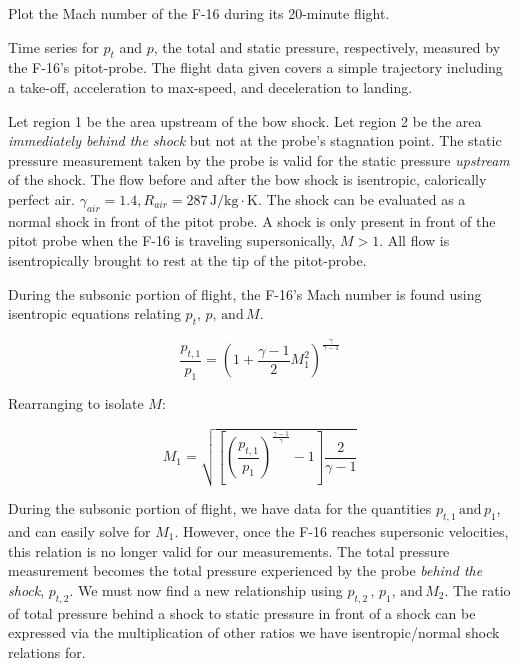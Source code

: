 \documentclass[../main.tex]{subfiles}
\begin{document}

 Plot the Mach number of the F-16 during its 20-minute flight.

\givens{}

Time series for \(p_t\) and \(p\), the total and static pressure, respectively, measured by the F-16's pitot-probe.
The flight data given covers a simple trajectory including a take-off, acceleration to max-speed, and deceleration to landing.

\assumptions{}

Let region 1 be the area upstream of the bow shock.
Let region 2 be the area \textit{immediately behind the shock} but not at the probe's stagnation point.
The static pressure measurement taken by the probe is valid for the static pressure \textit{upstream} of the shock.
The flow before and after the bow shock is isentropic, calorically perfect air. \(\gamma_{air} = 1.4, R_{air} = 287 \, \unit{\joule/\kilogram\cdot\kelvin}\).
The shock can be evaluated as a normal shock in front of the pitot probe.
A shock is only present in front of the pitot probe when the F-16 is traveling supersonically, \(M > 1\).
All flow is isentropically brought to rest at the tip of the pitot-probe.

\solution{}

During the subsonic portion of flight, the F-16's Mach number is found using isentropic equations relating \(p_t,\, p, \,\textrm{and} \, M\).

\[
    \frac{p_{t,1}}{p_1} = {\left({1 + \frac{\gamma-1}{2}M_1^2}\right)}^{\frac{\gamma}{\gamma-1}}
\]

Rearranging to isolate \(M\):

\[
    M_1 = \sqrt{
        \left[{{\left({\frac{p_{t,1}}{p_1}}\right)}^{\frac{\gamma-1}{\gamma}} - 1}\right]
        \frac{2}{\gamma-1}
    }
\]

During the subsonic portion of flight, we have data for the quantities \(p_{t,1} \, \textrm{and} \, p_1 \), and can easily solve for \(M_1\).
However, once the F-16 reaches supersonic velocities, this relation is no longer valid for our measurements. 
The total pressure measurement becomes the total pressure experienced by the probe \textit{behind the shock}, \(p_{t,2}\).
We must now find a new relationship using \(p_{t,2} \, , \, p_1 , \, \textrm{and} \, M_2\).
The ratio of total pressure behind a shock to static pressure in front of a shock can be expressed via the multiplication of other ratios we have isentropic/normal shock relations for.
\end{document}
